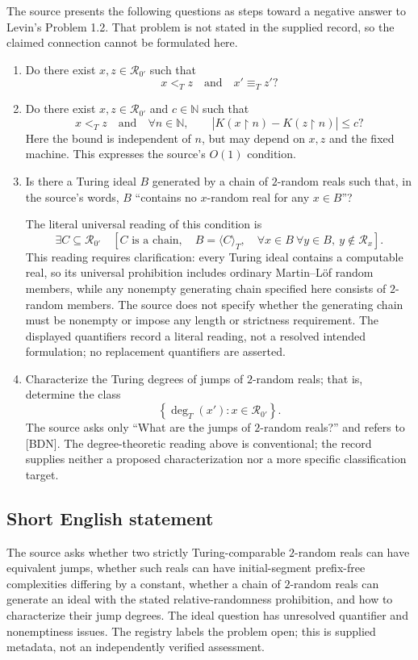 \documentclass[11pt]{article}
\newcommand{\N}{\mathbb{N}}
\begin{document}
The source presents the following questions as steps toward a negative answer to Levin's Problem 1.2. That problem is not stated in the supplied record, so the claimed connection cannot be formulated here.
\begin{enumerate}
\item Do there exist \(x,z\in\mathcal R_{0'}\) such that
\[
x<_T z\quad\text{and}\quad x'\equiv_T z'?
\]
\item Do there exist \(x,z\in\mathcal R_{0'}\) and \(c\in\N\) such that
\[
x<_T z\quad\text{and}\quad
\forall n\in\N,\qquad
\left|K(x\upharpoonright n)-K(z\upharpoonright n)\right|\leq c?
\]
Here the bound is independent of \(n\), but may depend on \(x,z\) and the fixed machine. This expresses the source's \(O(1)\) condition.
\item Is there a Turing ideal \(B\) generated by a chain of \(2\)-random reals such that, in the source's words, \(B\) ``contains no \(x\)-random real for any \(x\in B\)''?

The literal universal reading of this condition is
\[
\exists C\subseteq\mathcal R_{0'}\quad
\left[C\text{ is a chain},\quad B=\langle C\rangle_T,\quad
\forall x\in B\ \forall y\in B,\ y\notin\mathcal R_x\right].
\]
This reading requires clarification: every Turing ideal contains a computable real, so its universal prohibition includes ordinary Martin--L\"of random members, while any nonempty generating chain specified here consists of \(2\)-random members. The source does not specify whether the generating chain must be nonempty or impose any length or strictness requirement. The displayed quantifiers record a literal reading, not a resolved intended formulation; no replacement quantifiers are asserted.
\item Characterize the Turing degrees of jumps of \(2\)-random reals; that is, determine the class
\[
\left\{\deg_T(x'):x\in\mathcal R_{0'}\right\}.
\]
The source asks only ``What are the jumps of \(2\)-random reals?'' and refers to [BDN]. The degree-theoretic reading above is conventional; the record supplies neither a proposed characterization nor a more specific classification target.
\end{enumerate}
\subsection{Short English statement}
The source asks whether two strictly Turing-comparable \(2\)-random reals can have equivalent jumps, whether such reals can have initial-segment prefix-free complexities differing by a constant, whether a chain of \(2\)-random reals can generate an ideal with the stated relative-randomness prohibition, and how to characterize their jump degrees. The ideal question has unresolved quantifier and nonemptiness issues. The registry labels the problem open; this is supplied metadata, not an independently verified assessment.
\end{document}
